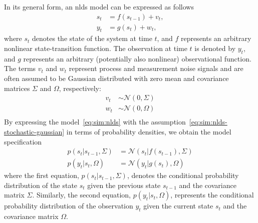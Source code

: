 In its general form, an \ac{nlds} model can be expressed as follows
\begin{equation}
  \label{eq:sim:nlds}
  \begin{split}
    s_t &= f(s_{t - 1}) + v_{t}, \\%
    y_t &= g(s_t) + w_{t}, %
  \end{split}
\end{equation}
where $s_t$ denotes the state of the system at time $t$, and $f$
represents an arbitrary nonlinear state-transition function.
The observation at time $t$ is denoted by $y_t$, and $g$ represents an arbitrary (potentially
also nonlinear) observational function.
The terms $v_{t}$ and $w_{t}$ represent process and measurement noise signals and are often assumed to be Gaussian distributed with zero mean and
covariance matrices $\Sigma$ and $\Omega$, respectively:
\begin{equation}
    \label{eq:sim:nlds-stochastic-gaussian}
    \begin{split}
        v_{t} &\sim \mathcal{N}(0, \Sigma) \\
        w_{t} &\sim \mathcal{N}(0, \Omega) \\
    \end{split}
\end{equation}
By expressing the model~\eqref{eq:sim:nlds} with the assumption~\eqref{eq:sim:nlds-stochastic-gaussian} 
in terms of probability densities, we obtain the model specification
\begin{equation}
  \label{eq:sim:nlds_probabilities}
  \begin{aligned}
    p(s_t\vert s_{t-1}, \Sigma)
     & = \mathcal{N}(s_t \vert f(s_{t-1}), \Sigma) \\ p(y_t\vert s_{t}, \Omega) & = \mathcal{N}(y_t
       \vert g(s_{t}), \Omega)
  \end{aligned}
\end{equation}
where the first equation, $p(s_t\vert
  s_{t-1}, \Sigma)$, denotes the conditional probability distribution of the state $s_t$ given the
previous state $s_{t-1}$ and the covariance matrix $\Sigma$.
Similarly, the second equation, $p(y_t\vert s_{t}, \Omega)$, represents the conditional probability
distribution of the observation $y_t$ given the current state $s_t$ and the covariance
matrix $\Omega$.

